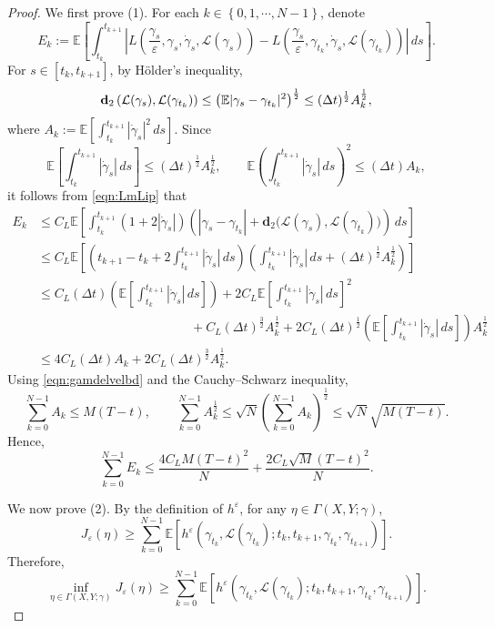 \documentclass[10pt,a4paper]{amsart}
\newcommand{\e}{\varepsilon}
\newcommand{\ep}{\varepsilon}
\begin{document}
\begin{proof}
We first prove (1). For each $k \in \left\{0, 1, \cdots, N-1\right\}$, denote
\[
E_k:=\mathbb{E}\left[\int_{t_k}^{t_{k+1}} \left|L\left( \frac{\gamma_s}{\e}, \gamma_s, \dot{\gamma}_s, \mathcal{L}(\gamma_s) \right)-
L\left(\frac{\gamma_s}{\ep}, \gamma_{t_k}, \dot{\gamma}_s, \mathcal{L}(\gamma_{t_k})\right)\right|\,ds\right].
\]
For $s\in[t_k, t_{k+1}]$, by H{\"o}lder's inequality,
\[
 {\bf d}_2\left(\mathcal{L}(\gamma_s), \mathcal{L}(\gamma_
    {t_k})\right) \leq \left(\mathbb{E}|\gamma_s-\gamma_{t_k}|^2 \right)^\frac{1}{2}\leq (\Delta t)^\frac{1}{2} A_k^\frac{1}{2},
\]
where $A_k := \mathbb{E}\left[\int_{t_k}^{t_{k+1}} |\dot{\gamma}_s|^2\,ds\right]$.
Since
\[
\mathbb{E}\left[\int_{t_k}^{t_{k+1}} |\dot{\gamma}_s|\,ds\right]
\le (\Delta t)^\frac{1}{2} A_k^\frac{1}{2},
\qquad
\mathbb{E}\left(\int_{t_k}^{t_{k+1}}|\dot\gamma_s|\,ds\right)^2
\le (\Delta t) A_k,
\]
it follows from \eqref{eqn:LmLip} that
\[
\begin{aligned}
E_k
&\le C_L \mathbb{E}\left[\int_{t_k}^{t_{k+1}}
\left(1+2|\dot\gamma_s|\right)
\left(
|\gamma_s-\gamma_{t_k}|
+ \mathbf d_2\bigl(\mathcal{L}(\gamma_s),\mathcal{L}(\gamma_{t_k})\bigr)
\right)\,ds \right]\\
&\le C_L \mathbb{E}\left[
\left(
t_{k+1}-t_k + 2\int_{t_k}^{t_{k+1}} |\dot\gamma_s|\,ds
\right)
\left(
\int_{t_k}^{t_{k+1}} |\dot\gamma_s|\,ds
+ (\Delta t)^{\frac{1}{2}} A_k^{\frac{1}{2}}
\right)
\right] \\
& \leq C_L (\Delta t )\left(\mathbb{E}\left[\int_{t_k}^{t_{k+1}} |\dot\gamma_s|\,ds\right]\right)
+2C_L \mathbb{E} \left[\int_{t_k}^{t_{k+1}} |\dot\gamma_s|\,ds\right]^2 \\
&\qquad \qquad \qquad \qquad \qquad \qquad + C_L (\Delta t)^{\frac{3}{2}} A_k^{\frac{1}{2}}
+2C_L (\Delta t)^{\frac{1}{2}}
\left(\mathbb{E}\left[\int_{t_k}^{t_{k+1}} |\dot\gamma_s|\,ds\right]\right) A_k^\frac{1}{2}\\
&\leq 4C_L (\Delta t) A_k
+ 2C_L (\Delta t)^{\frac{3}{2}} A_k^\frac{1}{2}.
\end{aligned}
\]
Using \eqref{eqn:gamdelvelbd} and the Cauchy–Schwarz inequality,
\[
\sum_{k=0}^{N-1}A_k\leq M(T-t) ,\qquad\sum_{k=0}^{N-1}A_k^\frac{1}{2} \leq \sqrt{N} \left(\sum_{k=0}^{N-1}A_k\right)^\frac{1}{2}\leq \sqrt{N} \sqrt{M(T-t)}.
\]
Hence,
\[
\sum_{k=0}^{N-1}E_k \leq  \frac{4C_LM(T-t)^2}{N} +   \frac{2C_L \sqrt{M}(T-t)^2}{N}.
\]

We now prove {\rm (2)}. By the definition of $h^\e$, for any $\eta\in \Gamma(X,Y;\gamma)$,
\[
J_\e(\eta)
\ge
\sum_{k=0}^{N-1}
 \mathbb{E}\left[
h^\e\left(\gamma_{t_k}, \mathcal{L}(\gamma_{t_k});t_k,t_{k+1},
\gamma_{t_k},\gamma_{t_{k+1}}\right)\right].
\]
Therefore,
\[
\inf_{\eta\in\Gamma(X,Y;\gamma)}J_\varepsilon(\eta)
\ge
\sum_{k=0}^{N-1}
\mathbb E\left[
h^\varepsilon\left(
\gamma_{t_k},
\mathcal{L}(\gamma_{t_k});
t_k,t_{k+1},
\gamma_{t_k},\gamma_{t_{k+1}}
\right)
\right].
\]


\end{proof}
\end{document}
